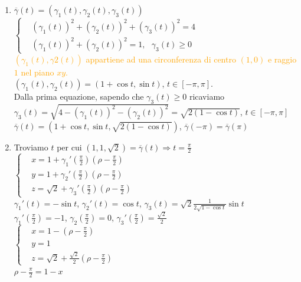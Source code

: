 \documentclass{article}
\begin{document}
\begin{enumerate}
    \item $\overline{\gamma}(t) =(\gamma_1(t), \gamma_2(t), \gamma_3(t))$\\
    $\begin{cases}
        &(\gamma_1(t))^2+(\gamma_2(t))^2+(\gamma_3 (t))^2=4\\
        &(\gamma_1(t))^2+(\gamma_2(t))^2=1,\,\,\,\, \gamma_3(t)\geq 0
    \end{cases}$\\
    \textcolor{orange}{$(\gamma_1 (t),\gamma2(t))$ appartiene ad una circonferenza di centro $(1,0)$ e raggio $1$ nel piano $xy$.}\\
    $(\gamma_1(t),\gamma_2(t))=(1+\cos t , \sin t)$, $t \in [-\pi, \pi]$.\\
    Dalla prima equazione, sapendo che $\gamma_3(t)\geq 0$ ricaviamo \\
    $\gamma_3 (t)=\sqrt{4-(\gamma_1(t))^2-(\gamma_2(t))^2}=\sqrt{2(1-\cos t)}$, $ t \in [-\pi,\pi]$\\
    $\overline{\gamma}(t)= (1+\cos t, \sin t, \sqrt{2(1-\cos t)})$, $\overline{\gamma} (-\pi) = \overline{\gamma}(\pi)$
    \item Troviamo $t$ per cui $(1,1,\sqrt{2})=\overline{\gamma}(t) \Rightarrow t = \frac{\pi}{2}$\\
    $\begin{cases}
        & x= 1+\gamma_1' (\frac{\pi}{2})(\rho -\frac{\pi}{2})\\
        & y= 1+\gamma_2' (\frac{\pi}{2})(\rho -\frac{\pi}{2})\\
        & z= \sqrt{2} + \gamma_3' (\frac{\pi}{2})(\rho - \frac{\pi}{2})
    \end{cases}$\\
    $\gamma_1'(t)=-\sin t$, $\gamma_2'(t)=\cos t$, $\gamma_3(t)=\sqrt{2} \frac{1}{2\sqrt{1-\cos t}}\sin t$\\
    $\gamma_1'\left(\frac{\pi}{2}\right)=-1$, $\gamma_2\left( \frac{\pi}{2}\right)=0$, $\gamma_3'\left( \frac{\pi}{2}\right)=\frac{\sqrt{2}}{2}$\\
    $\begin{cases}
      & x= 1-\left(\rho-\frac{\pi}{2}\right)\\
      & y= 1\\
      & z= \sqrt{2} +\frac{\sqrt{2}}{2}\left(\rho -\frac{\pi}{2}\right)
    \end{cases}$\\
    $\rho-\frac{\pi}{2}=1-x$\\

\end{enumerate}
\end{document}
